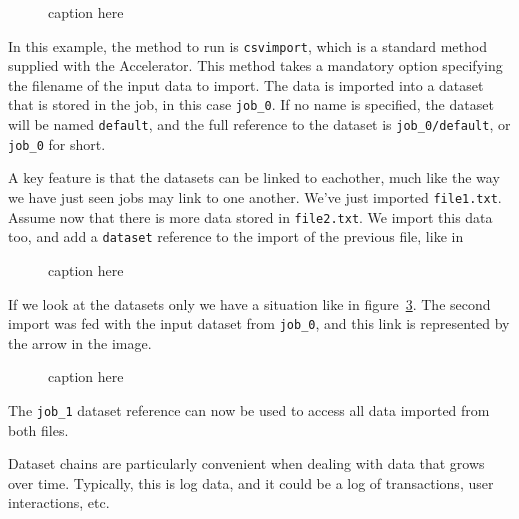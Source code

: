 \documentclass[a4paper]{article}
\begin{document}
\begin{figure}[h!]
  \begin{center}
    
    \caption{caption here}
    \label{fig:dataset_csvimport}
  \end{center}
\end{figure}

\noindent In this example, the method to run is \texttt{csvimport},
which is a standard method supplied with the Accelerator.  This method
takes a mandatory option specifying the filename of the input data to
import.  The data is imported into a dataset that is stored in the
job, in this case \texttt{job\_0}.  If no name is specified, the
dataset will be named \texttt{default}, and the full reference to the
dataset is \texttt{job\_0/default}, or \texttt{job\_0} for short.

A key feature is that the datasets can be linked to eachother, much
like the way we have just seen jobs may link to one another.  We've
just imported \texttt{file1.txt}.  Assume now that there is more data
stored in \texttt{file2.txt}.  We import this data too, and add a
\texttt{dataset} reference to the import of the previous file, like in

\begin{figure}[h!]
  \begin{center}
    
    \caption{caption here}
    \label{fig:dataset_csvimport_chain}
  \end{center}
\end{figure}

\noindent If we look at the datasets only we have a situation like in
figure~\ref{fig:dep_dataset_csvimport_chain}.  The second import was
fed with the input dataset from \texttt{job\_0}, and this link is
represented by the arrow in the image.

\begin{figure}[h!]
  \begin{center}
    
    \caption{caption here}
    \label{fig:dep_dataset_csvimport_chain}
  \end{center}
\end{figure}

\noindent The \texttt{job\_1} dataset reference can now be used to
access all data imported from both files.

Dataset chains are particularly convenient when dealing with data that
grows over time.  Typically, this is log data, and it could be a log
of transactions, user interactions, etc.
\end{document}
